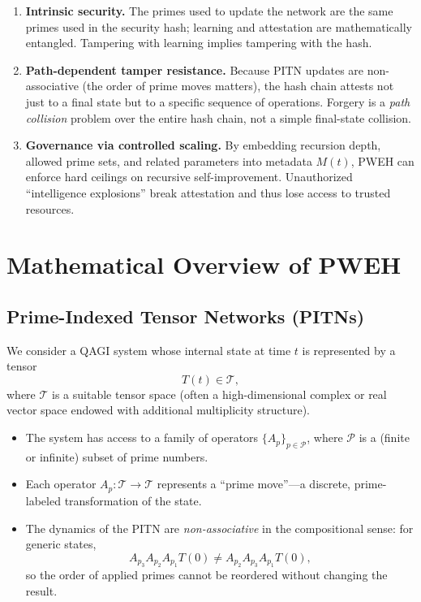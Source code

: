 \documentclass[11pt]{article}
\begin{document}
\begin{enumerate}[leftmargin=1.5em]
  \item \textbf{Intrinsic security.}
  The primes used to update the network are the same primes used in the security hash; learning and attestation are mathematically entangled.
  Tampering with learning implies tampering with the hash.

  \item \textbf{Path-dependent tamper resistance.}
  Because PITN updates are non-associative (the order of prime moves matters), the hash chain attests not just to a final state but to a specific sequence of operations.
  Forgery is a \emph{path collision} problem over the entire hash chain, not a simple final-state collision.

  \item \textbf{Governance via controlled scaling.}
  By embedding recursion depth, allowed prime sets, and related parameters into metadata \(M(t)\), PWEH can enforce hard ceilings on recursive self-improvement.
  Unauthorized ``intelligence explosions'' break attestation and thus lose access to trusted resources.
\end{enumerate}

\section{Mathematical Overview of PWEH}

\subsection{Prime-Indexed Tensor Networks (PITNs)}

We consider a QAGI system whose internal state at time \(t\) is represented by a tensor
\[
  T(t) \in \mathcal{T},
\]
where \(\mathcal{T}\) is a suitable tensor space (often a high-dimensional complex or real vector space endowed with additional multiplicity structure).

\begin{itemize}[leftmargin=1.5em]
  \item The system has access to a family of operators \(\{A_p\}_{p \in \mathcal{P}}\), where \(\mathcal{P}\) is a (finite or infinite) subset of prime numbers.
  \item Each operator \(A_p: \mathcal{T} \to \mathcal{T}\) represents a ``prime move''---a discrete, prime-labeled transformation of the state.
  \item The dynamics of the PITN are \emph{non-associative} in the compositional sense: for generic states,
  \[
    A_{p_3}A_{p_2}A_{p_1}T(0) \neq A_{p_2}A_{p_3}A_{p_1}T(0),
  \]
  so the order of applied primes cannot be reordered without changing the result.
\end{itemize}
\end{document}
